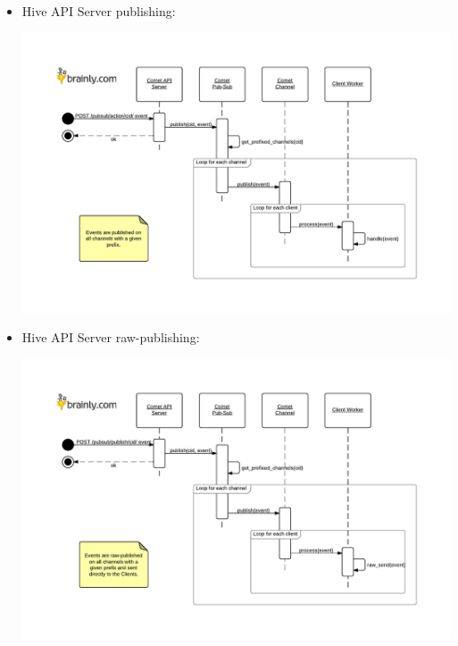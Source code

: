 \documentclass[a4paper]{article}
\begin{document}
\begin{landscape}
\begin{itemize}
\pagebreak


\item Hive API Server publishing:
\label{sec-7-3-4-3}%
\begin{center}
\includegraphics[scale=1.0]{./img/pubsub_api_publishing.pdf}
\end{center}

\pagebreak

\item Hive API Server raw-publishing:
\label{sec-7-3-4-4}%
\begin{center}
\includegraphics[scale=1.0]{./img/pubsub_api_raw_publishing.pdf}
\end{center}

\pagebreak


\end{itemize}
\end{landscape}
\end{document}
